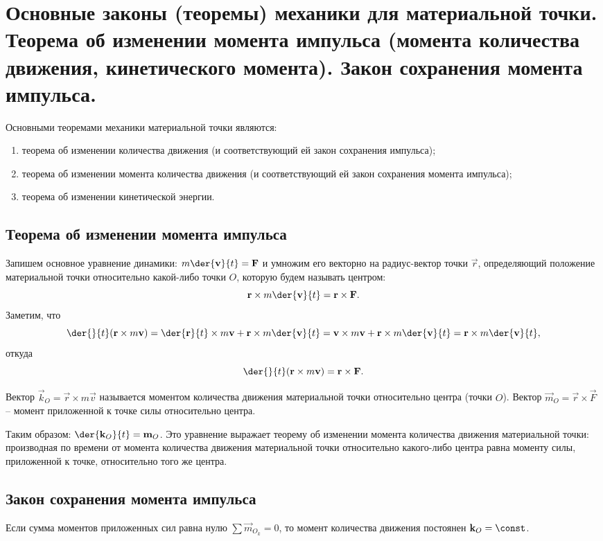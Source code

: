 \chapter{Основные законы (теоремы) механики для материальной точки. Теорема об
изменении момента импульса (момента количества движения, кинетического
момента). Закон сохранения момента импульса.}

Основными теоремами механики материальной точки являются:
\begin{enumerate}
    \item теорема об изменении количества движения (и соответствующий ей закон
    сохранения импульса);
    \item теорема об изменении момента количества движения (и соответствующий ей
    закон сохранения момента импульса);
    \item теорема об изменении кинетической энергии.
\end{enumerate}

\section{Теорема об изменении момента импульса}

Запишем основное уравнение динамики: \( \ds m\der{\vec{v}}{t} = \vec{F} \) и
умножим его векторно на радиус-вектор точки \( \vec{r} \), определяющий положение
материальной точки относительно какой-либо точки \( O \), которую будем называть
центром:
\[
    \vec{r}\times m\der{\vec{v}}{t} = \vec{r}\times\vec{F}.
\]
Заметим, что
\[
    \der{}{t}(\vec{r}\times m\vec{v}) = \der{\vec{r}}{t}\times m\vec{v} +
    \vec{r}\times m\der{\vec{v}}{t} = \vec{v}\times m\vec{v} +
    \vec{r}\times m\der{\vec{v}}{t} = \vec{r}\times m\der{\vec{v}}{t},
\]
откуда
\[
    \der{}{t}(\vec{r}\times m\vec{v}) = \vec{r}\times\vec{F}.
\]

Вектор \( \vec{k}_O = \vec{r}\times m\vec{v} \) называется моментом количества
движения материальной точки относительно центра (точки \( O \)). Вектор
\( \vec{m}_O = \vec{r}\times\vec{F} \) -- момент приложенной к точке силы
относительно центра.

Таким образом: \( \ds \der{\vec{k}_O}{t} = \vec{m}_O \). Это уравнение выражает
теорему об изменении момента количества движения материальной точки: производная
по времени от момента количества движения материальной точки относительно
какого-либо центра равна моменту силы, приложенной к точке, относительно того же
центра.

\section{Закон сохранения момента импульса}

Если сумма моментов приложенных сил равна нулю \( \sum\vec{m}_{O_k} = 0 \),
то момент количества движения постоянен \( \vec{k}_O = \const \).

\newpage %
